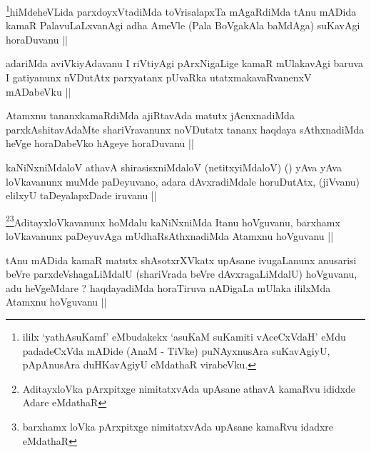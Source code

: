 
\begin{artha}
\footnote{ililx `yathAsuKamf' eMbudakekx `asuKaM suKamiti vAceCxVdaH'
  eMdu padadeCxVda mADide (AnaM - TiVke) puNAyxnusAra suKavAgiyU,
  pApAnusAra duHKavAgiyU eMdathaR virabeVku.}hiMdeheVLida parxdoyxVtadiMda toVrisalapxTa mAgaRdiMda tAnu
mADida kamaR PalavuLaLxvanAgi adha AmeVle (Pala BoVgakAla baMdAga)
suKavAgi horaDuvanu ||
\end{artha}

\begin{artha}
adariMda aviVkiyAdavanu I riVtiyAgi pArxNigaLige kamaR mUlakavAgi
baruva I gatiyanunx nVDutAtx parxyatanx pUvaRka utatxmakavaRvanenxV
mADabeVku ||
\end{artha}

\begin{artha}
Atamxnu tananxkamaRdiMda ajiRtavAda matutx jAcnxnadiMda
parxkAshitavAdaMte shariVravanunx noVDutatx tananx haqdaya
sAthxnadiMda heVge horaDabeVko hAgeye horaDuvanu ||
\end{artha}


\begin{artha}
kaNiNxniMdaloV athavA shirasisxniMdaloV (netitxyiMdaloV) (\quad) yAva
yAva loVkavanunx muMde paDeyuvano, adara dAvxradiMdale horuDutAtx,
(jiVvanu) elilxyU taDeyalapxDade iruvanu ||
\end{artha}

\begin{artha}
\footnote{AditayxloVka pArxpitxge nimitatxvAda upAsane athavA kamaRvu
  ididxde Adare eMdathaR}\footnote{barxhamx loVka pArxpitxge
  nimitatxvAda upAsane kamaRvu idadxre eMdathaR}AditayxloVkavanunx hoMdalu kaNiNxniMda Itanu
hoVguvanu, barxhamx loVkavanunx paDeyuvAga mUdhaRsAthxnadiMda Atamxnu
hoVguvanu ||
\end{artha}


\begin{artha}
tAnu mADida kamaR matutx shAsotxrXVkatx upAsane ivugaLanunx anusarisi
beVre parxdeVshagaLiMdalU (shariVrada beVre dAvxragaLiMdalU)
hoVguvanu, adu heVgeMdare ? haqdayadiMda horaTiruva nADigaLa mUlaka
ililxMda Atamxnu hoVguvanu ||
\end{artha}


